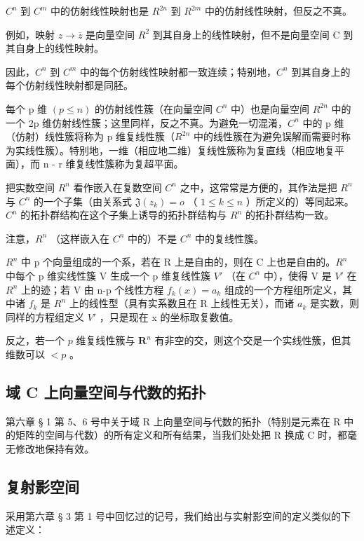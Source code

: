 \(C^{n}\) 到 \(C^{m}\) 中的仿射线性映射也是 \(R^{2n}\) 到 \(R^{2m}\) 中的仿射线性映射，但反之不真。

例如，映射 \(z \rightarrow \overline{z}\) 是向量空间 \(R^{2}\) 到其自身上的线性映射，但不是向量空间 C 到其自身上的线性映射。

因此，\(C^{n}\) 到 \(C^{m}\) 中的每个仿射线性映射都一致连续；特别地，\(C^{n}\) 到其自身上的每个仿射线性映射都是同胚。

每个 p 维 \((p \leqslant n)\) 的仿射线性簇（在向量空间 \(C^{n}\) 中）也是向量空间 \(R^{2n}\) 中的一个 2p 维仿射线性簇；这里同样，反之不真。为避免一切混淆，\(C^{n}\) 中的 p 维（仿射）线性簇将称为 p 维复线性簇（\(R^{2n}\) 中的线性簇在为避免误解而需要时称为实线性簇）。特别地，一维（相应地二维）复线性簇称为复直线（相应地复平面），而 n - r 维复线性簇称为复超平面。

把实数空间 \(R^{n}\) 看作嵌入在复数空间 \(C^{n}\) 之中，这常常是方便的，其作法是把 \(R^{n}\) 与 \(C^{n}\) 的一个子集（由关系式 \(\mathfrak{J}(z_{k}) = o\) （ \(1 \leqslant k \leqslant n\) ）所定义的）等同起来。\(C^{n}\) 的拓扑群结构在这个子集上诱导的拓扑群结构与 \(R^{n}\) 的拓扑群结构一致。

注意，\(R^{n}\) （这样嵌入在 \(C^{n}\) 中的）不是 \(C^{n}\) 中的复线性簇。

\(R^{n}\) 中 p 个向量组成的一个系，若在 R 上是自由的，则在 C 上也是自由的。\(R^{n}\) 中每个 p 维实线性簇 V 生成一个 p 维复线性簇 \(V'\) （在 \(C^{n}\) 中），使得 V 是 \(V'\) 在 \(R^{n}\) 上的迹；若 V 由 n-p 个线性方程 \(f_{k}(x)=a_{k}\) 组成的一个方程组所定义，其中诸 \(f_{k}\) 是 \(R^{n}\) 上的线性型（具有实系数且在 R 上线性无关），而诸 \(a_{k}\) 是实数，则同样的方程组定义 \(V'\) ，只是现在 x 的坐标取复数值。

反之，若一个 \(p\) 维复线性簇与 \(\mathbf{R}^n\) 有非空的交，则这个交是一个实线性簇，但其维数可以 \(< p\) 。

\subsection{域 C 上向量空间与代数的拓扑}

第六章 § 1 第 5、6 号中关于域 R 上向量空间与代数的拓扑（特别是元素在 R 中的矩阵的空间与代数）的所有定义和所有结果，当我们处处把 R 换成 C 时，都毫无修改地保持有效。

\subsection{复射影空间}

采用第六章 § 3 第 1 号中回忆过的记号，我们给出与实射影空间的定义类似的下述定义：

